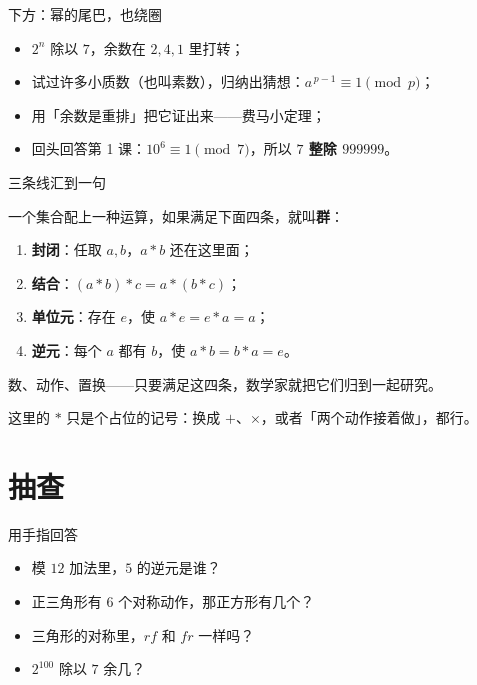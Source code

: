 \documentclass[10pt]{beamer}
\begin{document}
\begin{frame}{下方：幂的尾巴，也绕圈}
  \begin{itemize}
    \item \(2^n\) 除以 \(7\)，余数在 \(2,4,1\) 里打转；
    \item 试过许多小质数（也叫素数），归纳出猜想：\(a^{\,p-1}\equiv1\pmod p\)；
    \item 用「余数是重排」把它证出来——费马小定理；
    \item 回头回答第 1 课：\(10^{6}\equiv1\pmod 7\)，所以 \textbf{\(7\) 整除 \(999999\)}。
  \end{itemize}
\end{frame}

\begin{frame}{三条线汇到一句}
  \begin{definition}[群]
    一个集合配上一种运算，如果满足下面四条，就叫\textbf{群}：
    \begin{enumerate}
      \item \textbf{封闭}：任取 \(a,b\)，\(a*b\) 还在这里面；
      \item \textbf{结合}：\((a*b)*c=a*(b*c)\)；
      \item \textbf{单位元}：存在 \(e\)，使 \(a*e=e*a=a\)；
      \item \textbf{逆元}：每个 \(a\) 都有 \(b\)，使 \(a*b=b*a=e\)。
    \end{enumerate}
  \end{definition}
  \pause
  \begin{center}
    {\large 数、动作、置换——只要满足这四条，数学家就把它们归到一起研究。}
  \end{center}
  \pause
  \begin{att}
    这里的 \(*\) 只是个占位的记号：换成 \(+\)、\(\times\)，或者「两个动作接着做」，都行。
  \end{att}
\end{frame}

\section{抽查}

\begin{frame}{用手指回答}
  \begin{itemize}
    \item 模 \(12\) 加法里，\(5\) 的逆元是谁？
    \item 正三角形有 \(6\) 个对称动作，那正方形有几个？
    \item 三角形的对称里，\(rf\) 和 \(fr\) 一样吗？
    \item \(2^{100}\) 除以 \(7\) 余几？
  \end{itemize}
\end{frame}
\end{document}

